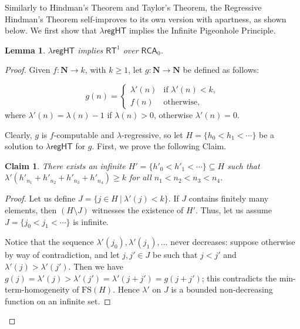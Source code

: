 \documentclass[a4paper,11pt]{article}
\newtheorem{lemma}{Lemma}
\newtheorem*{claim*}{Claim}
\newcommand\Nat{\mathbf{N}}
\newcommand\RCA{\mathsf{RCA}}
\newcommand\RT{\mathsf{RT}}
\newcommand\regHT{\mathsf{regHT}}
\newcommand\FS{\mathrm{FS}}
\newcommand\ap{\mathsf{ap}}
\newcommand\lambdam{\lambda'}
\begin{document}
Similarly to Hindman's Theorem and Taylor's Theorem, the Regressive Hindman's Theorem self-improves to its own version with apartness, as shown below. %
We first show that $\lambda\regHT$ implies the Infinite Pigeonhole Principle.

\begin{lemma} \label{regHTtoRT1}
$\lambda\regHT$ implies $\RT^1$  over $\RCA_0$.
\end{lemma}

\begin{proof}
Given $f: \Nat \to k$, with $k\geq 1$, let $g: \Nat \to \Nat$ be defined as follows:

\begin{equation*}
g(n) =
\begin{cases}
\lambdam(n) & \text{if } \lambdam(n) < k,\\
f(n) & \text{otherwise,}
\end{cases}
\end{equation*}
where $\lambdam(n) = \lambda(n)-1$ if $\lambda(n)>0$, otherwise $\lambdam(n) = 0$.

Clearly, $g$ is $f$-computable and $\lambda$-regressive, so let $H = \{h_0 < h_1 < \cdots\}$ be a solution to $\lambda\regHT$ for $g$.
First, we prove the following Claim.


\begin{claim*}
There exists an infinite $H' = \{h'_0 < h'_1 < \cdots\} \subseteq H$ such that $\lambdam(h'_{n_1} + h'_{n_2} + h'_{n_3} + h'_{n_4}) \geq k$ for all $n_1 < n_2 < n_3 < n_4$.
\end{claim*}

\begin{proof} \let\qed\relax
Let us define $J = \{j \in H\ |\ \lambdam(j) < k\}$. If $J$ contains finitely many elements, then $(H \setminus J)$ witnesses the existence of $H'$. 
Thus, let us assume $J = \{j_0 < j_1 < \cdots\}$ is infinite.

Notice that the sequence $\lambdam(j_0), \lambdam(j_1), \dots$ never decreases: suppose otherwise by way of contradiction, and let $j,j' \in J$ be such that $j<j'$ and $\lambdam(j) > \lambdam(j')$. Then 
we have $g(j) = \lambdam(j) > \lambdam(j') = \lambdam(j+j') = g(j+j')$;  this contradicts the min-term-homogeneity of $\FS(H)$. Hence $\lambdam$ on $J$ is a bounded non-decreasing function on an infinite set. 


\end{proof}
\end{proof}
\end{document}
